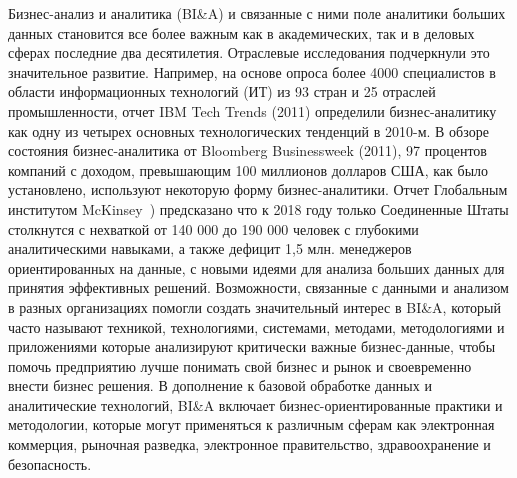 Бизнес-анализ и аналитика (BI\&A) и связанные с ними
поле аналитики больших данных становится все более важным
как в академических, так и в деловых сферах
последние два десятилетия. Отраслевые исследования подчеркнули это
значительное развитие. Например, на основе опроса
более 4000 специалистов в области информационных технологий (ИТ) из 93
стран и 25 отраслей промышленности, отчет IBM Tech Trends
(2011) определили бизнес-аналитику как одну из четырех основных
технологических тенденций в 2010-м. В обзоре состояния
бизнес-аналитика от Bloomberg Businessweek (2011), 97 процентов компаний с доходом, превышающим 100 миллионов долларов США,
как было установлено, используют некоторую форму бизнес-аналитики. Отчет Глобальным институтом McKinsey~\cite{Maybury:2004}) предсказано
что к 2018 году только Соединенные Штаты столкнутся с нехваткой
от 140 000 до 190 000 человек с глубокими аналитическими навыками,
а также дефицит 1,5 млн. менеджеров ориентированных на данные, с
новыми идеями для анализа больших данных для принятия эффективных решений.
Возможности, связанные с данными и анализом в разных
организациях помогли создать значительный интерес
в BI\&A, который часто называют техникой, технологиями,
системами, методами, методологиями и приложениями
которые анализируют критически важные бизнес-данные, чтобы помочь предприятию лучше
понимать свой бизнес и рынок и своевременно внести бизнес
решения. В дополнение к базовой обработке данных и
аналитические технологий, BI\&A включает бизнес-ориентированные
практики и методологии, которые могут применяться к различным
сферам как электронная коммерция, рыночная разведка,
электронное правительство, здравоохранение и безопасность.